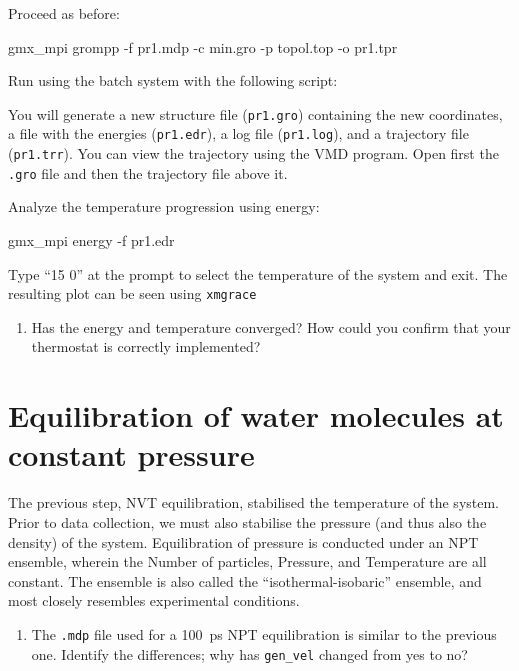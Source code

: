 \documentclass[10pt]{article}
\begin{document}
Proceed as before:

\begin{cmdline}
gmx_mpi grompp -f pr1.mdp -c min.gro -p topol.top -o pr1.tpr
\end{cmdline}

Run using the batch system with the following script:

You will generate a new structure file (\texttt{pr1.gro}) containing the new coordinates, a file with the energies (\texttt{pr1.edr}), a log file (\texttt{pr1.log}), and a trajectory file (\texttt{pr1.trr}). You can view the trajectory using the VMD program. Open first the \texttt{.gro} file and then the trajectory file above it. 

Analyze the temperature progression using energy:
\begin{cmdline}
gmx_mpi energy -f pr1.edr 
\end{cmdline}

Type ``15 0'' at the prompt to select the temperature of the system and exit. The resulting plot can be seen using \texttt{xmgrace}

\begin{question}
    \begin{enumerate}[leftmargin=0.6cm]
        \renewcommand{\labelenumi}{Q\arabic{enumi}.}
        \setcounter{enumi}{7}
        \item Has the energy and temperature converged? How could you confirm that your thermostat is correctly implemented?
    \end{enumerate}
\end{question}


\section{Equilibration of water molecules at constant pressure}

The previous step, NVT equilibration, stabilised the temperature of the system. Prior to data collection, we must also stabilise the pressure (and thus also the density) of the system. Equilibration of pressure is conducted under an NPT ensemble, wherein the Number of particles, Pressure, and Temperature are all constant. The ensemble is also called the ``isothermal-isobaric'' ensemble, and most closely resembles experimental conditions.

\begin{question}
    \begin{enumerate}[leftmargin=0.6cm]
        \renewcommand{\labelenumi}{Q\arabic{enumi}.}
        \setcounter{enumi}{8}
        \item The \texttt{.mdp} file used for a 100~ps NPT equilibration is similar to the previous one. Identify the differences; why has \texttt{gen\_vel} changed from yes to no?
    \end{enumerate}
\end{question}
\end{document}
